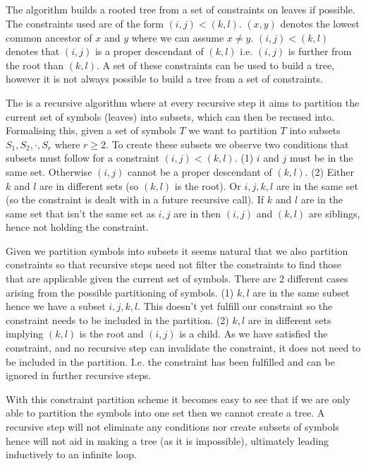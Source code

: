 \subsection{}
The  algorithm builds a rooted tree from a set of constraints on leaves if possible.
The constraints used are of the form $(i,j)<(k,l)$. $(x,y)$ denotes the lowest common ancestor of $x$ and $y$ where we can assume $x \neq y$. $(i,j)<(k,l)$ denotes that $(i,j)$ is a proper descendant of $(k,l)$ i.e. $(i,j)$ is further from the root than $(k,l)$.
A set of these constraints can be used to build a tree, however it is not always possible to build a tree from a set of constraints.

The  is a recursive algorithm where at every recursive step it aims to partition the current set of symbols (leaves) into subsets, which can then be  recused  into.
Formalising this, given a set of symbols $T$ we want to partition $T$ into subsets $S_1, S_2, \cdot, S_r$ where $r \geq 2$. To create these subsets we observe two conditions that subsets must follow for a constraint $(i,j)<(k,l)$.
(1) $i$ and $j$ must be in the same set.
Otherwise $(i, j)$ cannot be a proper descendant of $(k,l)$.
(2) Either $k$ and $l$ are in different sets (so $(k,l)$ is the root).
Or $i,j,k,l$ are in the same set (so the constraint is dealt with in a future recursive call).
If $k$ and $l$ are in the same set that isn't the same set as $i,j$ are in then $(i,j)$ and $(k,l)$ are siblings, hence not holding the constraint.

Given we partition symbols into subsets it seems natural that we also partition constraints so that recursive steps need not filter the constraints to find those that are applicable given the current set of symbols.
There are 2 different cases arising from the possible partitioning of symbols.
(1) $k,l$ are in the same subset hence we have a subset $i,j,k,l$. This doesn't yet fulfill our constraint so the constraint needs to be included in the partition.
(2) $k,l$ are in different sets implying $(k,l)$ is the root and $(i,j)$ is a child.
As we have satisfied the constraint, and no recursive step can invalidate the constraint, it does not need to be included in the partition. I.e. the constraint has been fulfilled and can be ignored in further recursive steps.

With this constraint partition scheme it becomes easy to see that if we are only able to partition the symbols into one set then we cannot create a tree.
A recursive step will not eliminate any conditions nor create subsets of symbols hence will not aid in making a tree (as it is impossible), ultimately leading inductively to an infinite loop.

